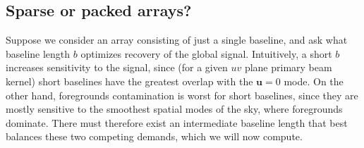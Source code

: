 \documentclass[twocolumn,apj,numberedappendix]{emulateapj}
\begin{document}
\subsection{Sparse or packed arrays?}

Suppose we consider an array consisting of just a single baseline, and ask what baseline length $b$ optimizes recovery of the global signal.  Intuitively, a short $b$ increases sensitivity to the signal, since (for a given $uv$ plane primary beam kernel) short baselines have the greatest overlap with the $\mathbf{u}=0$ mode.  On the other hand, foregrounds contamination is worst for short baselines, since they are mostly sensitive to the smoothest spatial modes of the sky, where foregrounds dominate.  There must therefore exist an intermediate baseline length that best balances these two competing demands, which we will now compute.
\end{document}
